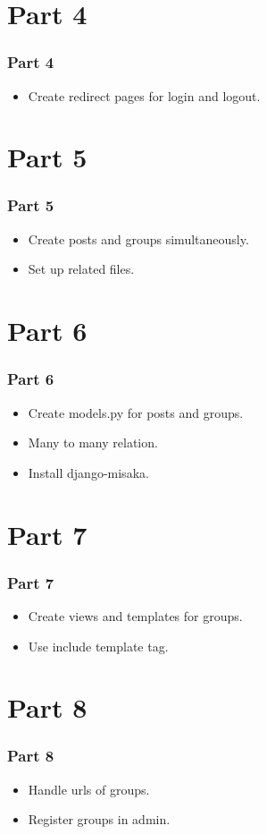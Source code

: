 \documentclass{beamer}
\begin{document}
\section{Part 4}
\begin{frame}
	\frametitle{Part 4}
	\begin{itemize}
		\item Create redirect pages for login and logout.
	\end{itemize}
	
\end{frame}

\section{Part 5}
\begin{frame}
	\frametitle{Part 5}
	\begin{itemize}
		\item Create posts and groups simultaneously.
		\item Set up related files.
		
	\end{itemize}
\end{frame}

\section{Part 6}
\begin{frame}
\frametitle{Part 6}
\begin{itemize}
	\item Create models.py for posts and groups.
	\item Many to many relation.
	\item Install django-misaka.
	
\end{itemize}
\end{frame}

\section{Part 7}
\begin{frame}
\frametitle{Part 7}
\begin{itemize}
	\item Create views and templates for groups.
	\item Use include template tag.
\end{itemize}
\end{frame}

\section{Part 8}
\begin{frame}
\frametitle{Part 8}
\begin{itemize}
	\item Handle urls of groups.
	\item Register groups in admin.
	
\end{itemize}
\end{frame}
\end{document}
